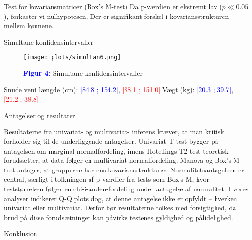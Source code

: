 \documentclass[final]{beamer}
\newlength{\colwidth}
\begin{document}
\begin{frame}[t]
\begin{columns}[t]
\begin{column}{\colwidth}
\begin{block}{Test for kovariansmatricer (Box’s M-test)}
\vspace{-0.5em}
Da p-værdien er ekstremt lav ($p \ll 0.05$), forkaster vi nulhypotesen. 
Der er signifikant forskel i kovariansstrukturen mellem kønnene.
\end{block}

\vspace{-1.0em}  
\begin{block}{Simultane konfidensintervaller}
  \justifying
	\vspace{-0.5em}  
	\begin{figure}[h!]
		\centering
		\texttt{[image: plots/simultan6.png]}
  		
		\textbf{\textcolor{blue}{Figur 4:}} Simultane konfidensintervaller
		
	\end{figure}

\begin{center}
Snude vent længde (cm): \textcolor{blue}{[84.8 ; 154.2]}, \textcolor{red}{[88.1 ; 151.0]} \quad
Vægt (kg): \textcolor{blue}{[20.3 ; 39.7]}, \textcolor{red}{[21.2 ; 38.8]}
\end{center}



  \end{block}
  
  
  

  \vspace{-1em}   
  \begin{block}{Antagelser og resultater}
  \justifying

Resultaterne fra univariat- og multivariat- inferens kræver, at man kritisk forholder sig til de underliggende antagelser. Univariat T-test bygger på antagelsen om marginal normalfordeling, imens Hotellings T2-test teoretisk forudsætter, at data følger en multivariat normalfordeling. Manova og Box’s M-test antager, at grupperne har ens kovariansstrukturer. Normalitetsantagelsen er central, særligt i tolkningen af p-værdier fra tests som Box’s M, hvor teststørrelsen følger en chi-i-anden-fordeling under antagelse af normalitet. I vores analyser indikerer Q-Q plots dog, at denne antagelse ikke er opfyldt – hverken univariat eller multivariat. Derfor bør resultaterne tolkes med forsigtighed, da brud på disse forudsætninger kan påvirke testenes gyldighed og pålidelighed.

\end{block}
  


\vspace{-1em} 
\begin{block}{Konklusion}
  \justifying
	

\end{block}
\end{column}
\end{columns}
\end{frame}
\end{document}

